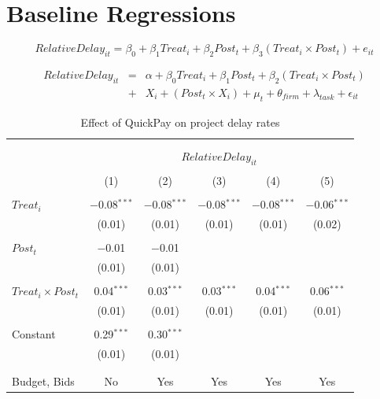 \documentclass[
]{article}
\begin{document}
\hypertarget{baseline-regressions}{%
\section{Baseline Regressions}\label{baseline-regressions}}

\[ RelativeDelay_{it} = \beta_0 + \beta_1 Treat_i + \beta_2 Post_t + \beta_3 (Treat_i \times Post_t) + e_{it}\]

\[ \begin{aligned} RelativeDelay_{it} &=& \alpha+\beta_0 Treat_i + \beta_1 Post_t + \beta_2 (Treat_i \times Post_t)\\
&+&  X_i + (Post_t \times X_i) + \mu_t + \theta_{firm} + \lambda_{task}+ \epsilon_{it}
\end{aligned}\]

\begin{table}[H] \centering 
  \caption{Effect of QuickPay on project delay rates} 
  \label{} 
\small 
\begin{tabular}{@{\extracolsep{-2pt}}lccccc} 
\\[-1.8ex]\hline 
\hline \\[-1.8ex] 
\\[-1.8ex] & \multicolumn{5}{c}{$RelativeDelay_{it}$} \\ 
\\[-1.8ex] & (1) & (2) & (3) & (4) & (5)\\ 
\hline \\[-1.8ex] 
 $Treat_i$ & $-$0.08$^{***}$ & $-$0.08$^{***}$ & $-$0.08$^{***}$ & $-$0.08$^{***}$ & $-$0.06$^{***}$ \\ 
  & (0.01) & (0.01) & (0.01) & (0.01) & (0.02) \\ 
  & & & & & \\ 
 $Post_t$ & $-$0.01 & $-$0.01 &  &  &  \\ 
  & (0.01) & (0.01) &  &  &  \\ 
  & & & & & \\ 
 $Treat_i \times Post_t$ & 0.04$^{***}$ & 0.03$^{***}$ & 0.03$^{***}$ & 0.04$^{***}$ & 0.06$^{***}$ \\ 
  & (0.01) & (0.01) & (0.01) & (0.01) & (0.01) \\ 
  & & & & & \\ 
 Constant & 0.29$^{***}$ & 0.30$^{***}$ &  &  &  \\ 
  & (0.01) & (0.01) &  &  &  \\ 
  & & & & & \\ 
\hline \\[-1.8ex] 
Budget, Bids & No & Yes & Yes & Yes & Yes \\ 

\end{tabular}
\end{table}
\end{document}
